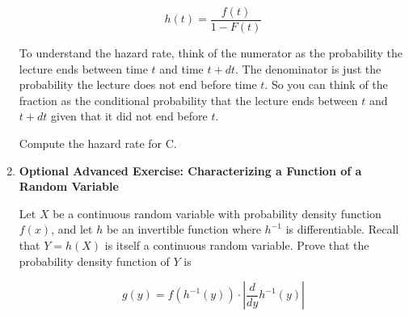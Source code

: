 \documentclass[12pt,a4paper]{article}
\numberwithin{equation}{subsection}
\begin{document}
\begin{enumerate}
$$h(t) = \frac{f(t)}{1-F(t)}$$

To understand the hazard rate, think of the numerator as the probability the lecture ends between time $t$ and time $t+ dt$.  The denominator is just the probability the lecture does not end before time $t$.  So you can think of the fraction as the conditional probability that the lecture ends between $t$ and $t + dt$ given that it did not end before $t$.

Compute the hazard rate for C.

\item \textbf{Optional Advanced Exercise: Characterizing a Function of a Random Variable}

Let $X$ be a continuous random variable with probability density function $f(x)$, and let $h$ be an invertible function where $h^{-1}$ is differentiable.  Recall that $Y = h(X)$ is itself a continuous random variable.  Prove that the probability density function of $Y$ is 

$$g(y) =f(h^{-1}(y)) \cdot \left| \frac{d}{dy}h^{-1}(y) \right| $$

\end{enumerate}
\end{document}
